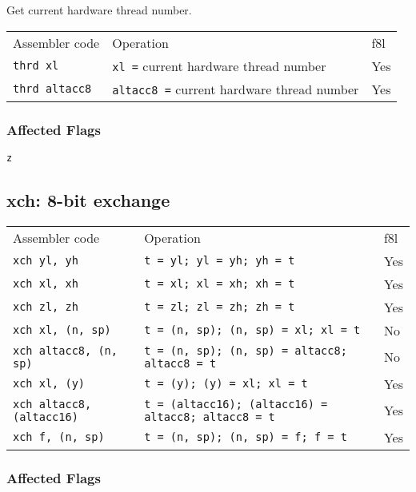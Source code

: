 \documentclass{book}
\begin{document}
Get current hardware thread number.

\begin{tabular}{l l l}
Assembler code        & Operation                                         & f8l \\
\texttt{thrd xl}      & \texttt{xl =} current hardware thread number      & Yes \\
\texttt{thrd altacc8} & \texttt{altacc8 =} current hardware thread number & Yes \\
\end{tabular}

\subsubsection*{Affected Flags}

\texttt{z}


\subsection{xch: 8-bit exchange}

\begin{tabular}{l l l}
Assembler code                   & Operation                                                  & f8l \\
\texttt{xch yl, yh}              & \texttt{t = yl; yl = yh; yh = t}                           & Yes \\
\texttt{xch xl, xh}              & \texttt{t = xl; xl = xh; xh = t}                           & Yes \\
\texttt{xch zl, zh}              & \texttt{t = zl; zl = zh; zh = t}                           & Yes \\
\texttt{xch xl, (n, sp)}         & \texttt{t = (n, sp); (n, sp) = xl; xl = t}                 & No \\
\texttt{xch altacc8, (n, sp)}    & \texttt{t = (n, sp); (n, sp) = altacc8; altacc8 = t}       & No \\
\texttt{xch xl, (y)}             & \texttt{t = (y); (y) = xl; xl = t}                         & Yes \\
\texttt{xch altacc8, (altacc16)} & \texttt{t = (altacc16); (altacc16) = altacc8; altacc8 = t} & Yes \\
\texttt{xch f, (n, sp)}          & \texttt{t = (n, sp); (n, sp) = f; f = t}                   & Yes
\end{tabular}

\subsubsection*{Affected Flags}
\end{document}
